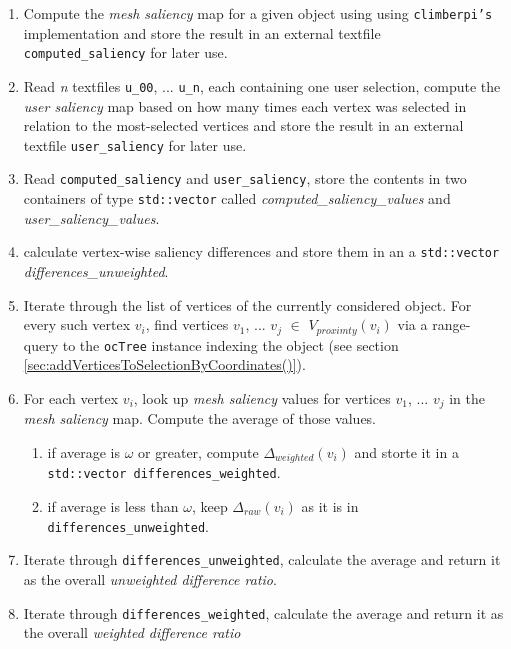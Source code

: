 \begin{enumerate}
	\item Compute the \textit{mesh saliency} map for a given object using using \texttt{climberpi's} implementation \cite{clms} and store the result in an external textfile \texttt{computed\_saliency} for later use.
	\item Read \textit{n} textfiles \texttt{u\_00}, ... \texttt{u\_n}, each containing one user selection, compute the \textit{user saliency} map based on how many times each vertex was selected in relation to the most-selected vertices and store the result in an external textfile \texttt{user\_saliency} for later use.
	\item Read \texttt{computed\_saliency} and \texttt{user\_saliency}, store the contents in two containers of type \texttt{std::vector} called \textit{computed\_saliency\_values} and \textit{user\_saliency\_values}.
	\item calculate vertex-wise saliency differences and store them in an a \texttt{std::vector} \textit{differences\_unweighted}.
	\item Iterate through the list of vertices of the currently considered object. For every such vertex $v_i$, find vertices $v_1$, ... $v_j$ $\in$ $V_{proximty}(v_i)$ via a range-query to the \texttt{ocTree} instance indexing the object (see section \ref{sec:addVerticesToSelectionByCoordinates()}).
	\item For each vertex $v_i$, look up \textit{mesh saliency} values for vertices $v_1$, ... $v_j$ in the \textit{mesh saliency} map. Compute the average of those values.
	\begin{enumerate}
		\item if average is $\omega$ or greater, compute $\Delta_{weighted}(v_i)$ and storte it in a \texttt{std::vector differences\_weighted}.
		\item if average is less than $\omega$, keep $\Delta_{raw}(v_i)$ as it is in \texttt{differences\_unweighted}.
	\end{enumerate}
	\item Iterate through \texttt{differences\_unweighted}, calculate the average and return it as the overall \textit{unweighted difference ratio}.
	\item Iterate through \texttt{differences\_weighted}, calculate the average and return it as the overall \textit{weighted difference ratio}
\end{enumerate}

